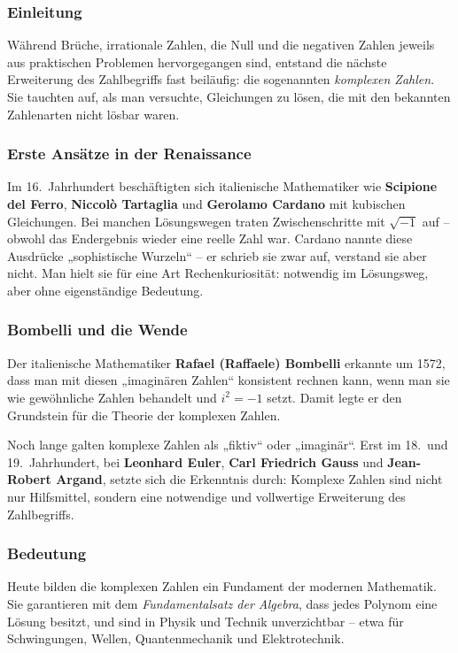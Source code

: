 \subsubsection*{Einleitung}
Während Brüche, irrationale Zahlen, die Null und die negativen Zahlen jeweils aus praktischen 
Problemen hervorgegangen sind, entstand die nächste Erweiterung des Zahlbegriffs fast beiläufig: 
die sogenannten \emph{komplexen Zahlen}.  
Sie tauchten auf, als man versuchte, Gleichungen zu lösen, 
die mit den bekannten Zahlenarten nicht lösbar waren.

\subsubsection*{Erste Ansätze in der Renaissance}
Im 16.~Jahrhundert beschäftigten sich italienische Mathematiker wie 
\textbf{Scipione del Ferro}, 
\textbf{Niccolò Tartaglia} und 
\textbf{Gerolamo Cardano} mit kubischen Gleichungen.  
Bei manchen Lösungswegen traten Zwischenschritte mit $\sqrt{-1}$ auf – 
obwohl das Endergebnis wieder eine reelle Zahl war.  
Cardano nannte diese Ausdrücke „sophistische Wurzeln“ – 
er schrieb sie zwar auf, verstand sie aber nicht.  
Man hielt sie für eine Art Rechenkuriosität: notwendig im Lösungsweg, 
aber ohne eigenständige Bedeutung.

\subsubsection*{Bombelli und die Wende}
Der italienische Mathematiker \textbf{Rafael (Raffaele) Bombelli} erkannte um 1572, 
dass man mit diesen „imaginären Zahlen“ konsistent rechnen kann, 
wenn man sie wie gewöhnliche Zahlen behandelt und $i^2=-1$ setzt.  
Damit legte er den Grundstein für die Theorie der komplexen Zahlen.

Noch lange galten komplexe Zahlen als „fiktiv“ oder „imaginär“.  
Erst im 18.~und 19.~Jahrhundert, bei \textbf{Leonhard Euler}, 
\textbf{Carl Friedrich Gauss} und 
\textbf{Jean-Robert Argand}, 
setzte sich die Erkenntnis durch:  
Komplexe Zahlen sind nicht nur Hilfsmittel, sondern eine 
notwendige und vollwertige Erweiterung des Zahlbegriffs.  

\subsubsection*{Bedeutung}
Heute bilden die komplexen Zahlen ein Fundament der modernen Mathematik.  
Sie garantieren mit dem \emph{Fundamentalsatz der Algebra}, 
dass jedes Polynom eine Lösung besitzt, 
und sind in Physik und Technik unverzichtbar – etwa für Schwingungen, Wellen, 
Quantenmechanik und Elektrotechnik.


